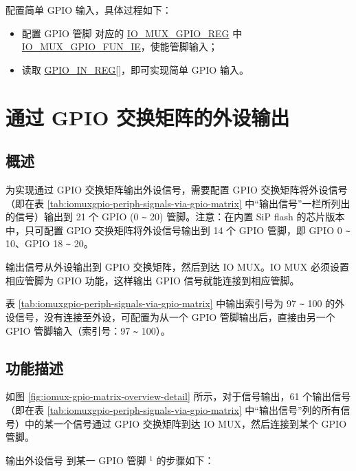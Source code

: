 \documentclass[main\_\_CN.tex]{subfiles}
\begin{document}
配置简单 GPIO 输入，具体过程如下：
\begin{itemize}
    \item 配置 GPIO 管脚  对应的 \hyperref[regdesc:IOMUXGPIONREG]{IO\_MUX\_GPIO\_REG} 中 \hyperref[fielddesc:IOMUXGPIONFUNIE]{IO\_MUX\_GPIO\_FUN\_IE}，使能管脚输入；
    \item 读取 \hyperref[regdesc:GPIOINREG]{GPIO\_IN\_REG[]}，即可实现简单 GPIO 输入。
\end{itemize}

\section{通过 GPIO 交换矩阵的外设输出}

\subsection{概述}

为实现通过 GPIO 交换矩阵输出外设信号，需要配置 GPIO 交换矩阵将外设信号（即在表 \ref{tab:iomuxgpio-periph-signals-via-gpio-matrix} 中“输出信号”一栏所列出的信号）输出到 21 个 GPIO (0 \verb+~+ 20) 管脚。注意：在内置 SiP flash 的芯片版本中，只可配置 GPIO 交换矩阵将外设信号输出到 14 个 GPIO 管脚，即 GPIO 0 \verb+~+ 10、GPIO 18 \verb+~+ 20。

输出信号从外设输出到 GPIO 交换矩阵，然后到达 IO MUX。IO MUX 必须设置相应管脚为 GPIO 功能，这样输出 GPIO 信号就能连接到相应管脚。

\begin{tiplisting}
表 \ref{tab:iomuxgpio-periph-signals-via-gpio-matrix} 中输出索引号为 97 \verb+~+ 100 的外设信号，没有连接至外设，可配置为从一个 GPIO 管脚输出后，直接由另一个 GPIO 管脚输入（索引号：97 \verb+~+ 100）。
\end{tiplisting}
\vspace{-2em}
\subsection{功能描述}\label{IOMUXPeripheralOutput}

如图 \ref{fig:iomux-gpio-matrix-overview-detail} 所示，对于信号输出，61 个输出信号（即在表 \ref{tab:iomuxgpio-periph-signals-via-gpio-matrix} 中“输出信号”列的所有信号）中的某一个信号通过 GPIO 交换矩阵到达 IO MUX，然后连接到某个 GPIO 管脚。

输出外设信号  到某一 GPIO 管脚 \hyperref[output-note-1]{$^1$} 的步骤如下：
\end{document}
